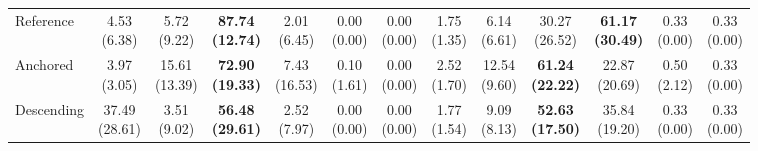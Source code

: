{\begin{tabular}{l|cccccc|cccccc}
Reference & \makecell{4.53 \\ (6.38)} & \makecell{5.72 \\ (9.22)} & {\cellcolor[HTML]{C8E6C9}} \bfseries \makecell{87.74 \\ (12.74)} & \makecell{2.01 \\ (6.45)} & \makecell{0.00 \\ (0.00)} & \makecell{0.00 \\ (0.00)} & \makecell{1.75 \\ (1.35)} & \makecell{6.14 \\ (6.61)} & {\cellcolor[HTML]{C8E6C9}} \makecell{30.27 \\ (26.52)} & \bfseries \makecell{61.17 \\ (30.49)} & \makecell{0.33 \\ (0.00)} & \makecell{0.33 \\ (0.00)} \\
Anchored & \makecell{3.97 \\ (3.05)} & \makecell{15.61 \\ (13.39)} & {\cellcolor[HTML]{C8E6C9}} \bfseries \makecell{72.90 \\ (19.33)} & \makecell{7.43 \\ (16.53)} & \makecell{0.10 \\ (1.61)} & \makecell{0.00 \\ (0.00)} & \makecell{2.52 \\ (1.70)} & \makecell{12.54 \\ (9.60)} & {\cellcolor[HTML]{C8E6C9}} \bfseries \makecell{61.24 \\ (22.22)} & \makecell{22.87 \\ (20.69)} & \makecell{0.50 \\ (2.12)} & \makecell{0.33 \\ (0.00)} \\
Descending & \makecell{37.49 \\ (28.61)} & \makecell{3.51 \\ (9.02)} & {\cellcolor[HTML]{C8E6C9}} \bfseries \makecell{56.48 \\ (29.61)} & \makecell{2.52 \\ (7.97)} & \makecell{0.00 \\ (0.00)} & \makecell{0.00 \\ (0.00)} & \makecell{1.77 \\ (1.54)} & \makecell{9.09 \\ (8.13)} & {\cellcolor[HTML]{C8E6C9}} \bfseries \makecell{52.63 \\ (17.50)} & \makecell{35.84 \\ (19.20)} & \makecell{0.33 \\ (0.00)} & \makecell{0.33 \\ (0.00)} \\
\bottomrule
\end{tabular}
}%
